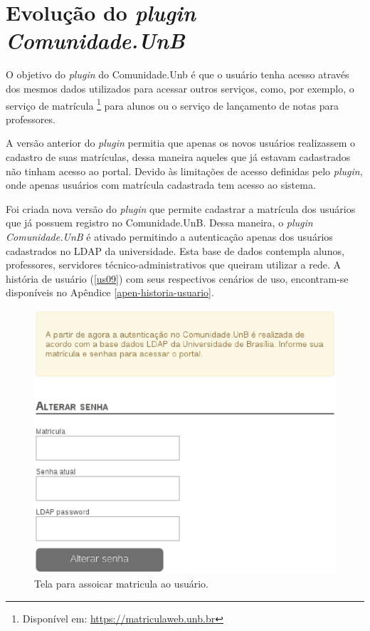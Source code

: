 
\section{Evolução do \textit{plugin Comunidade.UnB}}
\label{plugin-comunidade}

O objetivo do \textit{plugin} do Comunidade.Unb é que o usuário tenha acesso através dos mesmos dados utilizados para acessar outros serviços, como, por exemplo, o serviço de matrícula \footnote{Disponível em: \url{https://matriculaweb.unb.br}} para alunos ou o serviço de lançamento de notas para professores.

A versão anterior do \textit{plugin} permitia que apenas os novos usuários realizassem o cadastro de suas matrículas, dessa maneira aqueles que já estavam cadastrados não tinham acesso ao portal. Devido às limitações de acesso definidas pelo \textit{plugin}, onde apenas usuários com matrícula cadastrada tem acesso ao sistema.

Foi criada nova versão do \textit{plugin} que permite cadastrar a matrícula dos usuários que já possuem registro no Comunidade.UnB. Dessa maneira, o \textit{plugin Comunidade.UnB} é ativado permitindo a autenticação apenas dos usuários cadastrados no LDAP da universidade. Esta base de dados contempla alunos, professores, servidores técnico-administrativos que queiram utilizar a rede. A história de usuário (\ref{us09}) com seus respectivos cenários de uso, encontram-se disponíveis no Apêndice \ref{apen-historia-usuario}.

\begin{figure}[h]
    \centering
    \includegraphics[keepaspectratio=true,scale=0.5]
      {figuras/associate-matricula.eps}
    \caption{Tela para assoicar matricula ao usuário.}
    \label{fig:associate-matricula}
\end{figure}

